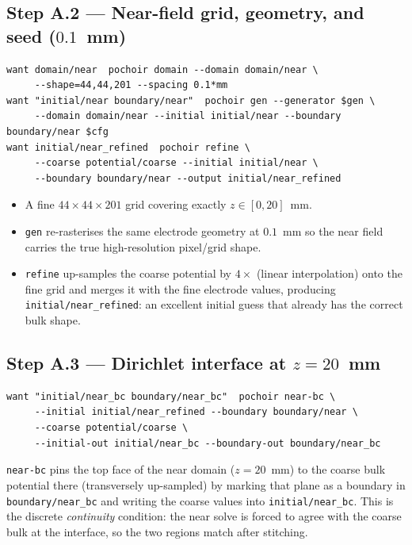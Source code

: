 \documentclass[11pt]{article}
\newcommand{\key}[1]{\texttt{#1}}
\newcommand{\cmd}[1]{\texttt{#1}}
\begin{document}
\subsection*{Step A.2 --- Near-field grid, geometry, and seed ($0.1$~mm)}
\begin{lstlisting}
want domain/near  pochoir domain --domain domain/near \
     --shape=44,44,201 --spacing 0.1*mm
want "initial/near boundary/near"  pochoir gen --generator $gen \
     --domain domain/near --initial initial/near --boundary boundary/near $cfg
want initial/near_refined  pochoir refine \
     --coarse potential/coarse --initial initial/near \
     --boundary boundary/near --output initial/near_refined
\end{lstlisting}
\begin{itemize}
  \item A fine $44\times44\times201$ grid covering exactly $z\in[0,20]$~mm.
  \item \cmd{gen} re-rasterises the same electrode geometry at $0.1$~mm so
        the near field carries the true high-resolution pixel/grid shape.
  \item \cmd{refine} up-samples the coarse potential by $4\times$ (linear
        interpolation) onto the fine grid and merges it with the fine
        electrode values, producing \key{initial/near\_refined}: an
        excellent initial guess that already has the correct bulk shape.
\end{itemize}

\subsection*{Step A.3 --- Dirichlet interface at $z=20$~mm}
\begin{lstlisting}
want "initial/near_bc boundary/near_bc"  pochoir near-bc \
     --initial initial/near_refined --boundary boundary/near \
     --coarse potential/coarse \
     --initial-out initial/near_bc --boundary-out boundary/near_bc
\end{lstlisting}
\cmd{near-bc} pins the top face of the near domain ($z=20$~mm) to the
coarse bulk potential there (transversely up-sampled) by marking that
plane as a boundary in \key{boundary/near\_bc} and writing the coarse
values into \key{initial/near\_bc}.  This is the discrete \emph{continuity}
condition: the near solve is forced to agree with the coarse bulk at the
interface, so the two regions match after stitching.
\end{document}
